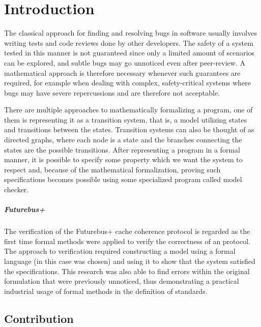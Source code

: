 \chapter{Introduction}
\label{introduction}

The classical approach for finding and resolving bugs in software usually involves writing tests and code reviews done by other developers.
The safety of a system tested in this manner is not guaranteed since only a limited amount of scenarios can be explored, and subtle bugs may go unnoticed even after peer-review.
A mathematical approach is therefore necessary whenever such guarantees are required, for example when dealing with complex, safety-critical systems where bugs may have severe repercussions and are therefore not acceptable.

There are multiple approaches to mathematically formalizing a program, one of them is representing it as a transition system, that is, a model utilizing states and transitions between the states.
Transition systems can also be thought of as directed graphs, where each node is a state and the branches connecting the states are the possible transitions.
After representing a program in a formal manner, it is possible to specify some property which we want the system to respect and, because of the mathematical formalization, proving such specifications becomes possible using some specialized program called model checker.

\paragraph*{Futurebus+}
The verification of the \ieee{} Futurebus+ cache coherence protocol \cite{DBLP:journals/fmsd/ClarkeGHJLMN95} is regarded as the first time formal methods were applied to verify the correctness of an \ieee{} protocol.
The approach to verification required constructing a model using a formal language (in this case \smv{} was chosen) and using it to show that the system satisfied the specifications.
This research was also able to find errors within the original formulation that were previously unnoticed, thus demonstrating a practical industrial usage of formal methods in the definition of standards.

\section{Contribution}

